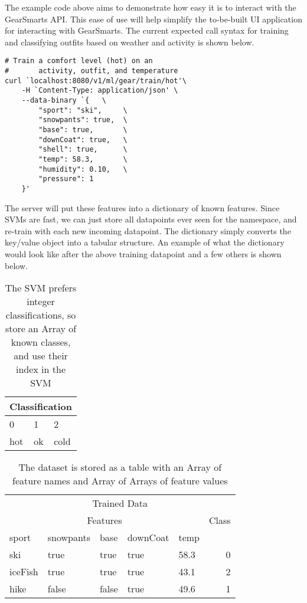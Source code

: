 The example code above aims to demonstrate how easy it is to interact with the GearSmarts API. This ease of use will
help simplify the to-be-built UI application for interacting with GearSmarts. The current expected call syntax for
training and classifying outfits based on weather and activity is shown below.

\begin{lstlisting}
# Train a comfort level (hot) on an
#       activity, outfit, and temperature
curl `localhost:8080/v1/ml/gear/train/hot'\
    -H `Content-Type: application/json' \
    --data-binary `{   \
        "sport": "ski",     \
        "snowpants": true,  \
        "base": true,       \
        "downCoat": true,   \
        "shell": true,      \
        "temp": 58.3,       \
        "humidity": 0.10,   \
        "pressure": 1
    }'
\end{lstlisting}

The server will put these features into a dictionary of known features. Since SVMs are fast, we can just store all
datapoints ever seen for the namespace, and re-train with each new incoming datapoint. The dictionary simply converts
the key/value object into a tabular structure. An example of what the dictionary would look like after the above
training datapoint and a few others is shown below.

\begin{table}
\label{table:classifications}
    \begin{tabular}{lll}
        \hline
        \multicolumn{3}{c}{Classification} \\
        \hline
        0 & 1 & 2 \\
        hot & ok & cold \\
        \hline
    \end{tabular}
    \caption{The SVM prefers integer classifications, so store an Array of known classes, and use their index in the SVM}
\end{table}

\begin{table}
\label{table:dictionary}
    \begin{tabular}{lllllr}
        \hline
        \multicolumn{6}{c}{Trained Data} \\
        \multicolumn{5}{c}{Features} & Class \\
        \hline
        sport   & snowpants & base  & downCoat & temp   \\
        \hline
        \hline
        ski     & true      & true  & true      & 58.3  & 0 \\
        iceFish & true      & true  & true      & 43.1  & 2 \\
        hike    & false     & false & true      & 49.6  & 1 \\
        \hline
    \end{tabular}
    \caption{The dataset is stored as a table with an Array of feature names and Array of Arrays of feature values}
\end{table}


